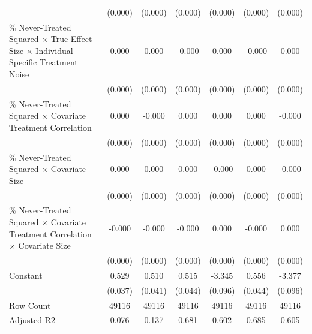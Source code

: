 \documentclass[12pt]{article}
\begin{document}
\begin{table}[htbp]
{\begin{tabular}{p{4.5in}|*{6}{c}}
                    &     (0.000)         &     (0.000)         &     (0.000)         &     (0.000)         &     (0.000)         &     (0.000)         \\
\% Never-Treated Squared $\times$ True Effect Size $\times$ Individual-Specific Treatment Noise&       0.000         &       0.000         &      -0.000         &       0.000         &      -0.000         &       0.000         \\
                    &     (0.000)         &     (0.000)         &     (0.000)         &     (0.000)         &     (0.000)         &     (0.000)         \\
\% Never-Treated Squared $\times$ Covariate Treatment Correlation&       0.000\sym{*}  &      -0.000         &       0.000         &       0.000         &       0.000         &      -0.000         \\
                    &     (0.000)         &     (0.000)         &     (0.000)         &     (0.000)         &     (0.000)         &     (0.000)         \\
\% Never-Treated Squared $\times$ Covariate Size&       0.000         &       0.000         &       0.000         &      -0.000\sym{**} &       0.000         &      -0.000         \\
                    &     (0.000)         &     (0.000)         &     (0.000)         &     (0.000)         &     (0.000)         &     (0.000)         \\
\% Never-Treated Squared $\times$ Covariate Treatment Correlation $\times$ Covariate Size&      -0.000         &      -0.000         &      -0.000         &       0.000         &      -0.000         &       0.000         \\
                    &     (0.000)         &     (0.000)         &     (0.000)         &     (0.000)         &     (0.000)         &     (0.000)         \\
Constant            &       0.529\sym{***}&       0.510\sym{***}&       0.515\sym{***}&      -3.345\sym{***}&       0.556\sym{***}&      -3.377\sym{***}\\
                    &     (0.037)         &     (0.041)         &     (0.044)         &     (0.096)         &     (0.044)         &     (0.096)         \\
\hline
Row Count           &   49116         &   49116         &   49116         &   49116         &   49116         &   49116         \\
Adjusted R2         &       0.076         &       0.137         &       0.681         &       0.602         &       0.685         &       0.605         \\

\end{tabular}}
\end{table}
\end{document}
